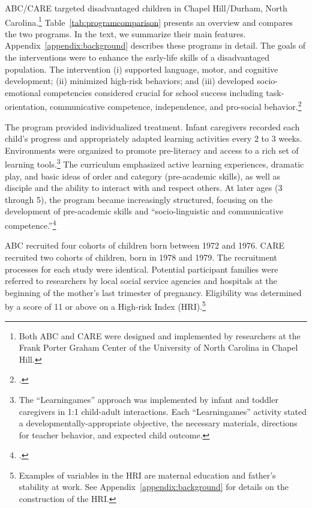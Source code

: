 ABC/CARE targeted disadvantaged children in Chapel Hill/Durham, North Carolina.\footnote{Both ABC and CARE were designed and implemented by researchers at the Frank Porter Graham Center of the University of North Carolina in Chapel Hill.} Table~\ref{tab:programcomparison} presents an overview and compares the two programs. In the text, we summarize their main features. Appendix~\ref{appendix:background} describes these programs in detail. The goals of the interventions were to enhance the early-life skills of a disadvantaged population. The intervention (i) supported language, motor, and cognitive development; (ii) minimized high-risk behaviors; and (iii) developed socio-emotional competencies considered crucial for school success including task-orientation, communicative competence, independence, and pro-social behavior.\footnote{\citet{Ramey_Collier_etal_1976_CarolinaAbecedarianProject, Ramey_etal_1985_Project-CARE_TiECSE, Sparling_1974_Synth_Edu_Infant_SPEECH, Wasik_Ramey_etal_1990_CD, Ramey-etal_2012-ABC}.}

The program provided individualized treatment. Infant caregivers recorded each child's progress and appropriately adapted learning activities every 2 to 3 weeks. Environments were organized to promote pre-literacy and access to a rich set of learning tools.\footnote{The ``Learningames'' approach was implemented by infant and toddler caregivers in 1:1 child-adult interactions. Each ``Learningames'' activity stated a developmentally-appropriate objective, the necessary materials, directions for teacher behavior, and expected child outcome.} The curriculum emphasized active learning experiences, dramatic play, and basic ideas of order and category (pre-academic skills), as well as disciple and the ability to interact with and respect others.  At later ages (3 through 5), the program became increasingly structured, focusing on the development of pre-academic skills and ``socio-linguistic and communicative competence.''\footnote{\citet{Ramey-et-al_1977_Intro-to-ABC, Haskins_1985_CD, Ramey_1981_Modification, Ramey_Campbell_1979_SR, Ramey_Smith_1977_AJMD, Ramey_McGinness_etal_1982_Abecedarianapproach, Sparling_Lewis_1979_BOOKLearninggamesFirstThree,Sparling_Lewis_1984_BOOKLearningGamesThreesFours}.}

ABC recruited four cohorts of children born between 1972 and 1976. CARE recruited two cohorts of children, born in 1978 and 1979. The recruitment processes for each study were identical. Potential participant families were referred to researchers by local social service agencies and hospitals at the beginning of the mother's last trimester of pregnancy. Eligibility was determined by a score of 11 or above on a High-risk Index (HRI).\footnote{Examples of variables in the HRI are maternal education and father's stability at work. See Appendix~\ref{appendix:background} for details on the construction of the HRI.}

